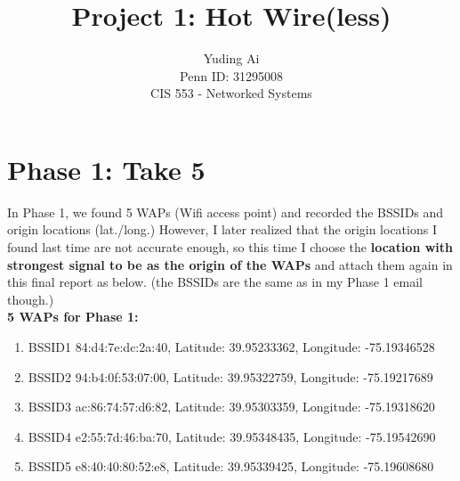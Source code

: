 \documentclass[usletter,12pt]{article}
\begin{document}
 
 
 
\title{Project 1: Hot Wire(less)}%
\author{Yuding Ai  \\Penn ID: 31295008\\ %
CIS 553 - Networked Systems} %
\maketitle
\section{Phase 1: Take 5}
In Phase 1, we found 5 WAPs (Wifi access point) and recorded the BSSIDs and origin locations (lat./long.) However, I later realized that the origin locations I found last time are not accurate enough, so this time I choose the \textbf{location with strongest signal to be as the origin of the WAPs} and attach them again in this final report as below. (the BSSIDs are the same as in my Phase 1 email though.) \\\textbf{5 WAPs for Phase 1:}
\begin{enumerate}
\item BSSID1 84:d4:7e:dc:2a:40, Latitude: 39.95233362, Longitude: -75.19346528
\item BSSID2 94:b4:0f:53:07:00, Latitude: 39.95322759, Longitude: -75.19217689 
\item BSSID3 ac:86:74:57:d6:82, Latitude: 39.95303359, Longitude: -75.19318620
\item BSSID4 e2:55:7d:46:ba:70, Latitude: 39.95348435, Longitude: -75.19542690
\item BSSID5 e8:40:40:80:52:e8, Latitude: 39.95339425, Longitude: -75.19608680
\label{enu}
\end{enumerate}
\end{document}
